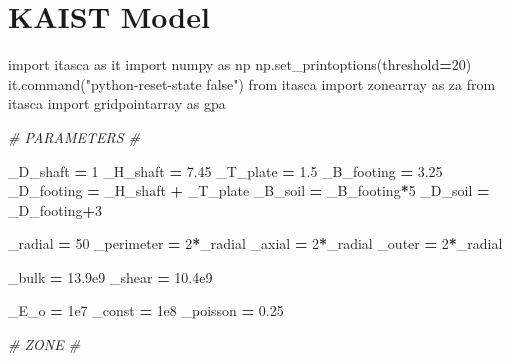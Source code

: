 \documentclass[a4paper, nobind]{templates/ociamthesis}
\newenvironment{Shaded}{\begin{snugshade}}{\end{snugshade}}
\newcommand{\CommentTok}[1]{\textcolor[rgb]{0.56,0.35,0.01}{\textit{#1}}}
\newcommand{\DecValTok}[1]{\textcolor[rgb]{0.00,0.00,0.81}{#1}}
\newcommand{\FloatTok}[1]{\textcolor[rgb]{0.00,0.00,0.81}{#1}}
\newcommand{\ImportTok}[1]{#1}
\newcommand{\NormalTok}[1]{#1}
\newcommand{\OperatorTok}[1]{\textcolor[rgb]{0.81,0.36,0.00}{\textbf{#1}}}
\newcommand{\StringTok}[1]{\textcolor[rgb]{0.31,0.60,0.02}{#1}}
\renewenvironment{Shaded}
{
  \vspace{10pt}%
  \begin{snugshade}%
}{%
  \end{snugshade}%
  \vspace{8pt}%
}
\begin{document}
\hypertarget{kaist-model-1}{%
\section{KAIST Model}\label{kaist-model-1}}

\begin{Shaded}
\begin{Highlighting}[]
\ImportTok{import}\NormalTok{ itasca }\ImportTok{as}\NormalTok{ it}
\ImportTok{import}\NormalTok{ numpy }\ImportTok{as}\NormalTok{ np}
\NormalTok{np.set\_printoptions(threshold}\OperatorTok{=}\DecValTok{20}\NormalTok{)}
\NormalTok{it.command(}\StringTok{"python{-}reset{-}state false"}\NormalTok{)}
\ImportTok{from}\NormalTok{ itasca }\ImportTok{import}\NormalTok{ zonearray }\ImportTok{as}\NormalTok{ za}
\ImportTok{from}\NormalTok{ itasca }\ImportTok{import}\NormalTok{ gridpointarray }\ImportTok{as}\NormalTok{ gpa}

\CommentTok{\# PARAMETERS \#}

\NormalTok{\_D\_shaft }\OperatorTok{=} \DecValTok{1}
\NormalTok{\_H\_shaft }\OperatorTok{=} \FloatTok{7.45}
\NormalTok{\_T\_plate }\OperatorTok{=} \FloatTok{1.5}
\NormalTok{\_B\_footing }\OperatorTok{=} \FloatTok{3.25}
\NormalTok{\_D\_footing }\OperatorTok{=}\NormalTok{ \_H\_shaft }\OperatorTok{+}\NormalTok{ \_T\_plate}
\NormalTok{\_B\_soil }\OperatorTok{=}\NormalTok{ \_B\_footing}\OperatorTok{*}\DecValTok{5}
\NormalTok{\_D\_soil }\OperatorTok{=}\NormalTok{ \_D\_footing}\OperatorTok{+}\DecValTok{3}

\NormalTok{\_radial }\OperatorTok{=} \DecValTok{50}
\NormalTok{\_perimeter }\OperatorTok{=} \DecValTok{2}\OperatorTok{*}\NormalTok{\_radial}
\NormalTok{\_axial }\OperatorTok{=} \DecValTok{2}\OperatorTok{*}\NormalTok{\_radial}
\NormalTok{\_outer }\OperatorTok{=} \DecValTok{2}\OperatorTok{*}\NormalTok{\_radial}

\NormalTok{\_bulk }\OperatorTok{=} \FloatTok{13.9e9}
\NormalTok{\_shear }\OperatorTok{=} \FloatTok{10.4e9}

\NormalTok{\_E\_o }\OperatorTok{=} \FloatTok{1e7}
\NormalTok{\_const }\OperatorTok{=} \FloatTok{1e8}
\NormalTok{\_poisson }\OperatorTok{=} \FloatTok{0.25}

\CommentTok{\# ZONE \#}


\end{Highlighting}
\end{Shaded}
\end{document}
